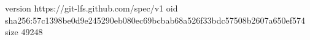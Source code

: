 version https://git-lfs.github.com/spec/v1
oid sha256:57c1398be0d9e245290eb080ec69bcbab68a526f33bdc57508b2607a650ef574
size 49248
